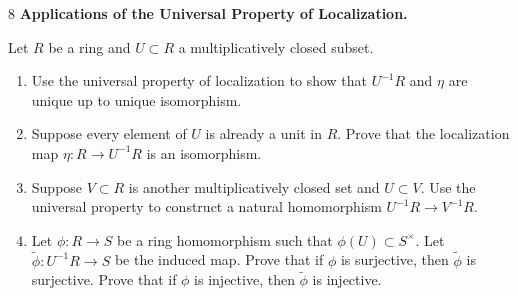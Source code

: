 \documentclass[Notebook.tex]{subfiles}
\begin{document}
\newpage 

\begin{problem}{8}
	\textbf{Applications of the Universal Property of Localization.} 
	
	Let $R$ be a ring and $U \subset R$ a multiplicatively closed subset. 
	\begin{enumerate}
		\item Use the universal property of localization to show that $U^{-1}R$ and $\eta$ are unique up to unique isomorphism.
		\item Suppose every element of $U$ is already a unit in $R$. Prove that the localization map $\eta:R\to U^{-1}R$ is an isomorphism.
		\item Suppose $V\subset R$ is another multiplicatively closed set and $U\subset V$. Use the universal property to construct a natural homomorphism $U^{-1}R\to V^{-1}R$. 
		\item Let $\phi:R\to S$ be a ring homomorphism such that $\phi(U)\subset S^{\times}$. Let $\tilde{\phi}:U^{-1}R\to S$ be the induced map. Prove that if $\phi$ is surjective, then $\tilde{\phi}$ is surjective. Prove that if $\phi$ is injective, then $\tilde{\phi}$ is injective.
	\end{enumerate}
\end{problem}
\end{document}
